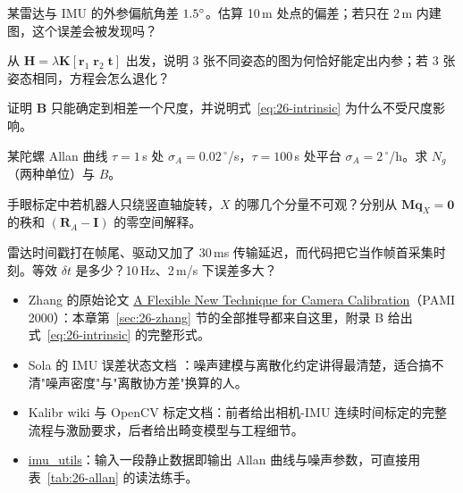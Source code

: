 \begin{problemset}

  \item 某雷达与 IMU 的外参偏航角差 $1.5^\circ$。估算 10\,m 处点的偏差；若只在 2\,m 内建图，这个误差会被发现吗？
  \item 从 $\bm{H}=\lambda\bm{K}[\bm{r}_1\;\bm{r}_2\;\bm{t}]$ 出发，说明 3 张不同姿态的图为何恰好能定出内参；若 3 张姿态相同，方程会怎么退化？
  \item 证明 $\bm{B}$ 只能确定到相差一个尺度，并说明式~\eqref{eq:26-intrinsic} 为什么不受尺度影响。
  \item 某陀螺 Allan 曲线 $\tau=1$\,s 处 $\sigma_A=0.02\,^{\circ}$/s，$\tau=100$\,s 处平台 $\sigma_A=2\,^{\circ}$/h。求 $N_g$（两种单位）与 $B$。
  \item 手眼标定中若机器人只绕竖直轴旋转，$X$ 的哪几个分量不可观？分别从 $\bm{M}\bm{q}_X=\bm{0}$ 的秩和 $(\bm{R}_A-\bm{I})$ 的零空间解释。
  \item 雷达时间戳打在帧尾、驱动又加了 30\,ms 传输延迟，而代码把它当作帧首采集时刻。等效 $\delta t$ 是多少？10\,Hz、2\,m/s 下误差多大？
\end{problemset}

\begin{reading}

\begin{itemize}
  \item Zhang 的原始论文 \href{https://ieeexplore.ieee.org/document/888718}{A Flexible New Technique for Camera Calibration}（PAMI 2000）：本章第~\ref{sec:26-zhang} 节的全部推导都来自这里，附录 B 给出式~\eqref{eq:26-intrinsic} 的完整形式。
  \item Sola 的 IMU 误差状态文档 \cite{sola2017eskf}：噪声建模与离散化约定讲得最清楚，适合搞不清"噪声密度"与"离散协方差"换算的人。
  \item Kalibr wiki 与 OpenCV 标定文档：前者给出相机-IMU 连续时间标定的完整流程与激励要求，后者给出畸变模型与工程细节。
  \item \href{https://github.com/rpng/imu_utils}{imu\_utils}：输入一段静止数据即输出 Allan 曲线与噪声参数，可直接用表~\ref{tab:26-allan} 的读法练手。
\end{itemize}


\end{reading}
